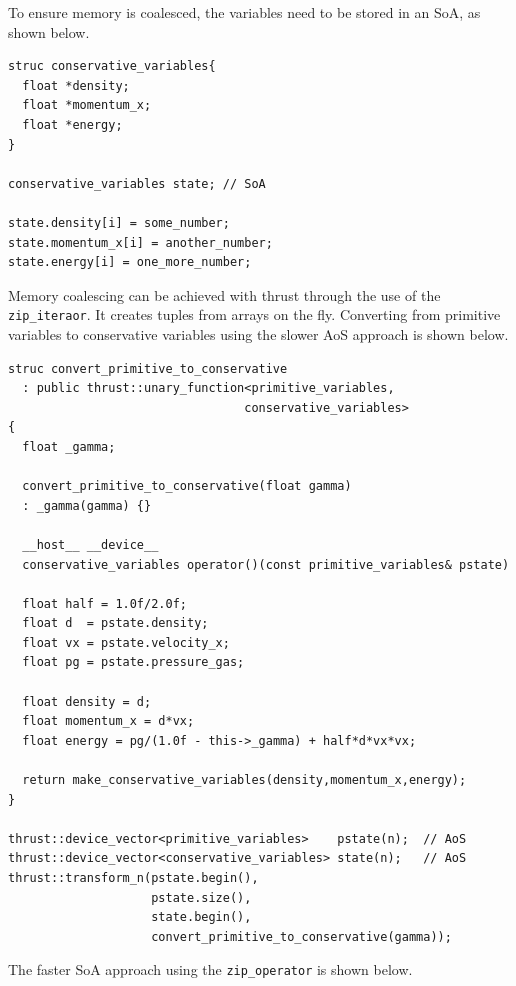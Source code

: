 To ensure memory is coalesced, the variables need to be stored in an SoA, as shown below.
\begin{lstlisting}
struc conservative_variables{
  float *density;
  float *momentum_x;
  float *energy;
}

conservative_variables state; // SoA

state.density[i] = some_number;
state.momentum_x[i] = another_number;
state.energy[i] = one_more_number;
\end{lstlisting} 
Memory coalescing can be achieved with thrust through the use of the \verb+zip_iteraor+.  It creates tuples from arrays on the fly.  Converting from primitive variables to conservative variables using the slower AoS approach is shown below.
\begin{lstlisting}
struc convert_primitive_to_conservative 
  : public thrust::unary_function<primitive_variables,
                                 conservative_variables>
{
  float _gamma;
  
  convert_primitive_to_conservative(float gamma)
  : _gamma(gamma) {}

  __host__ __device__
  conservative_variables operator()(const primitive_variables& pstate)

  float half = 1.0f/2.0f;
  float d  = pstate.density;
  float vx = pstate.velocity_x;
  float pg = pstate.pressure_gas;

  float density = d;
  float momentum_x = d*vx;
  float energy = pg/(1.0f - this->_gamma) + half*d*vx*vx;
  
  return make_conservative_variables(density,momentum_x,energy);
}

thrust::device_vector<primitive_variables>    pstate(n);  // AoS
thrust::device_vector<conservative_variables> state(n);   // AoS
thrust::transform_n(pstate.begin(),
                    pstate.size(),
                    state.begin(),
                    convert_primitive_to_conservative(gamma));
\end{lstlisting} 
The faster SoA approach using the \verb+zip_operator+ is shown below.
